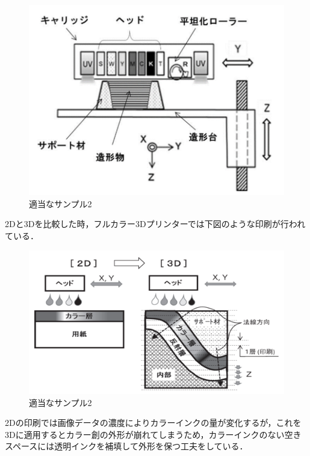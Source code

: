 \begin{figure}[H]
  \centering
  \includegraphics[width=11truecm]{./fig/フルカラー.png}
  \caption{適当なサンプル2}
  \label{fig:ferret}
\end{figure}

2Dと3Dを比較した時，フルカラー3Dプリンターでは下図のような印刷が行われている．

\begin{figure}[H]
  \centering
  \includegraphics[width=11truecm]{./fig/フルカラー2.png}
  \caption{適当なサンプル2}
  \label{fig:ferret}
\end{figure}

2Dの印刷では画像データの濃度によりカラーインクの量が変化するが，これを3Dに適用するとカラー創の外形が崩れてしまうため，カラーインクのない空きスペースには透明インクを補填して外形を保つ工夫をしている．


